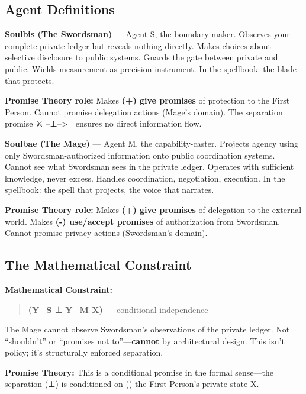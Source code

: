\documentclass[
  11pt,
]{article}
\begin{document}
\subsection{Agent Definitions}\label{agent-definitions}

\textbf{Soulbis (The Swordsman)} --- Agent S, the boundary-maker.
Observes your complete private ledger but reveals nothing directly.
Makes choices about selective disclosure to public systems. Guards the
gate between private and public. Wields measurement as precision
instrument. In the spellbook: the blade that protects.

\textbf{Promise Theory role:} Makes \textbf{(+) give promises} of
protection to the First Person. Cannot promise delegation actions
(Mage's domain). The separation promise ⚔️ --⊥--\textgreater{} 🧙
ensures no direct information flow.

\textbf{Soulbae (The Mage)} --- Agent M, the capability-caster. Projects
agency using only Swordsman-authorized information onto public
coordination systems. Cannot see what Swordsman sees in the private
ledger. Operates with sufficient knowledge, never excess. Handles
coordination, negotiation, execution. In the spellbook: the spell that
projects, the voice that narrates.

\textbf{Promise Theory role:} Makes \textbf{(+) give promises} of
delegation to the external world. Makes \textbf{(-) use/accept promises}
of authorization from Swordsman. Cannot promise privacy actions
(Swordsman's domain).

\subsection{The Mathematical
Constraint}\label{the-mathematical-constraint}

\textbf{Mathematical Constraint:}

\begin{quote}
\textbf{(Y\_S ⊥ Y\_M \textbar{} X)} --- conditional independence
\end{quote}

The Mage cannot observe Swordsman's observations of the private ledger.
Not ``shouldn't'' or ``promises not to''---\textbf{cannot} by
architectural design. This isn't policy; it's structurally enforced
separation.

\textbf{Promise Theory:} This is a conditional promise in the formal
sense---the separation (⊥) is conditioned on (\textbar) the First
Person's private state X.
\end{document}
